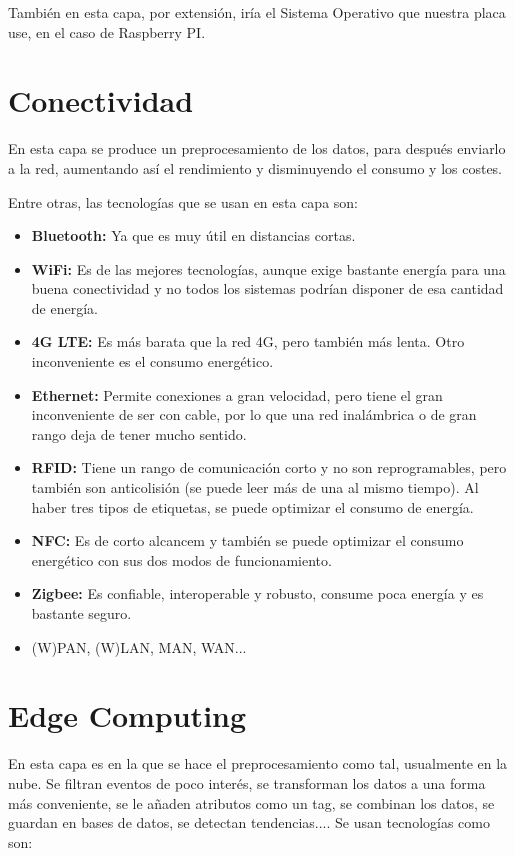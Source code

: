 \documentclass{article}
\begin{document}
También en esta capa, por extensión, iría el Sistema Operativo que nuestra placa use, en el caso de Raspberry PI.

\section{Conectividad}

En esta capa se produce un preprocesamiento de los datos, para después enviarlo a la red, aumentando así el rendimiento y disminuyendo el consumo y los costes.

Entre otras, las tecnologías que se usan en esta capa son:

\begin{itemize}
\item \textbf{Bluetooth:} Ya que es muy útil en distancias cortas.
\item \textbf{WiFi:} Es de las mejores tecnologías, aunque exige bastante energía para una buena conectividad y no todos los sistemas podrían disponer de esa cantidad de energía.
\item \textbf{4G LTE:} Es más barata que la red 4G, pero también más lenta. Otro inconveniente es el consumo energético.
\item \textbf{Ethernet:} Permite conexiones a gran velocidad, pero tiene el gran inconveniente de ser con cable, por lo que una red inalámbrica o de gran rango deja de tener mucho sentido.
\item \textbf{RFID:} Tiene un rango de comunicación corto y no son reprogramables, pero también son anticolisión (se puede leer más de una al mismo tiempo). Al haber tres tipos de etiquetas, se puede optimizar el consumo de energía.
\item \textbf{NFC:} Es de corto alcancem y también se puede optimizar el consumo energético con sus dos modos de funcionamiento.
\item \textbf{Zigbee:} Es confiable, interoperable y robusto, consume poca energía y es bastante seguro.
\item (W)PAN, (W)LAN, MAN, WAN...
\end{itemize}

\section{Edge Computing}

En esta capa es en la que se hace el preprocesamiento como tal, usualmente en la nube. Se filtran eventos de poco interés, se transforman los datos a una forma más conveniente, se le añaden atributos como un tag, se combinan los datos, se guardan en bases de datos, se detectan tendencias.... Se usan tecnologías como son:
\end{document}

